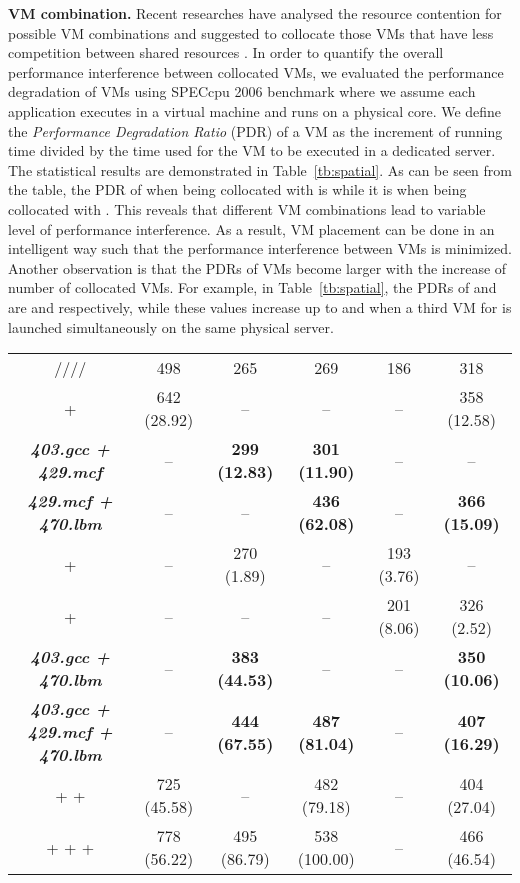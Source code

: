\documentclass[10pt,journal]{IEEEtran}
\begin{document}
\textbf{VM combination.} 
Recent researches have analysed the resource contention for possible VM combinations and suggested to collocate those VMs that have less competition between shared resources \cite{Govindan11, Chiang11, Mars11, Roytman13, Kim13, Verboven13}. In order to quantify the overall performance interference between collocated VMs, we evaluated the performance degradation of VMs using SPECcpu 2006 benchmark \cite{SPEC06} where we assume each application executes in a virtual machine and runs on a physical core. We define the \textit{Performance Degradation Ratio} (PDR) of a VM as the increment of running time divided by the time used for the VM to be executed in a dedicated server. The statistical results are demonstrated in Table~\ref{tb:spatial}. As can be seen from the table, the PDR of  when being collocated with  is  while it is  when being collocated with . This reveals that different VM combinations lead to variable level of performance interference. As a result, VM placement can be done in an intelligent way such that the performance interference between VMs is minimized. Another observation is that the PDRs of VMs become larger with the increase of number of collocated VMs. For example, in Table~\ref{tb:spatial}, the PDRs of  and  are  and  respectively, while these values increase up to  and  when a third VM for  is launched simultaneously on the same physical server.

\renewcommand{\arraystretch}{1.3}
\begin{table*}[htbp]
\centering
\caption{\label{tb:spatial}Running times (and stretches in percentile) of applications (VMs) collocated in the same physical server. (For example, the 1st row means each application runs on a dedicated server and, the 3rd row means  and  collocate in a server, et al.)}
\begin{tabular}{c|c|c|c|c|c}\hline\hline
&&&&&\\\hline
////&498&265&269&186&318\\\hline
 + &642 (28.92)&--&--&--&358 (12.58)\\
\textbf{\textit{403.gcc + 429.mcf}}&--&{\bf 299 (12.83)}&{\bf 301 (11.90)}&--&--\\
\textbf{\textit{429.mcf + 470.lbm}}&--&--&{\bf 436 (62.08)}&--&{\bf 366 (15.09)}\\
 + &--&270 (1.89)&--&193 (3.76)&--\\
 + &--&--&--&201 (8.06)&326 (2.52)\\
\textbf{\textit{403.gcc + 470.lbm}}&--&{\bf 383 (44.53)}&--&--&{\bf 350 (10.06)}\\\hline
\textbf{\textit{403.gcc + 429.mcf + 470.lbm}}&--&{\bf 444 (67.55)}&{\bf 487 (81.04)}&--&{\bf 407 (16.29)}\\
 +  + &725 (45.58)&--&482 (79.18)&--&404 (27.04)\\
 +  +  + &778 (56.22)&495 (86.79)&538 (100.00)&--&466 (46.54)\\\hline\hline
\end{tabular}
\end{table*}
\end{document}
